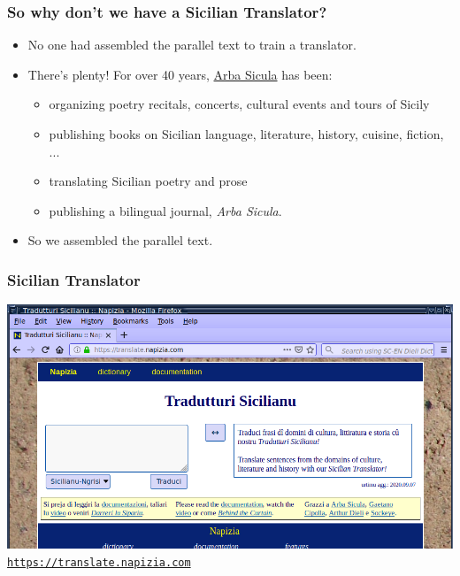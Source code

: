 \documentclass{beamer}
\begin{document}

\begin{frame}
  \frametitle{So why don't we have a Sicilian Translator?}
  \vspace{-1.0em}
  \begin{itemize}
  \item No one had assembled the parallel text to train a translator.
    \vspace{1em}
    \item There's plenty!  For over 40 years, \href{http://www.arbasicula.org/}{Arba Sicula} has been:
    \begin{itemize}
    \item organizing poetry recitals, concerts, cultural events and tours of Sicily
    \item publishing books on Sicilian language, literature, history, cuisine, fiction, ...
    \item translating Sicilian poetry and prose
    \item publishing a bilingual journal, \textit{Arba Sicula}.
    \end{itemize}
  \vspace{1em}
  \item So we assembled the parallel text.
  \end{itemize} 
\end{frame}


\begin{frame}
  \frametitle{Sicilian Translator}
  \vspace{-1.0em}
  \href{https://translate.napizia.com}{%
    \includegraphics[width=\textwidth]{images/browser-white-box_v1.png}
  }
  \vspace{-1.0em}
  \hspace{-7.0pt}
  \footnotesize{\href{https://translate.napizia.com}{\texttt{https://translate.napizia.com}}}
\end{frame}
\end{document}
